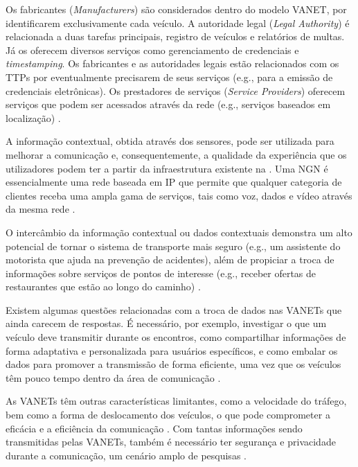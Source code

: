 \documentclass[mestrado, pre-defesa, english, brazil]{packages/icmc}
\begin{document}
Os fabricantes (\textit{Manufacturers}) são considerados dentro do modelo VANET, por identificarem exclusivamente cada veículo. A autoridade legal (\textit{Legal Authority}) é relacionada a duas tarefas principais, registro de veículos e relatórios de multas. Já os  oferecem diversos serviços como gerenciamento de credenciais e \textit{timestamping}. Os fabricantes e as autoridades legais estão relacionados com os TTPs por eventualmente precisarem de seus serviços (e.g., para a emissão de credenciais eletrônicas). Os prestadores de serviços (\textit{Service Providers}) oferecem serviços que podem ser acessados através da rede (e.g., serviços baseados em localização) \cite{Fuentes-2011}.

A informação contextual, obtida através dos sensores, pode ser utilizada para melhorar a comunicação e, consequentemente, a qualidade da experiência que os utilizadores podem ter a partir da infraestrutura existente na . Uma NGN é essencialmente uma rede baseada em IP que permite que qualquer categoria de clientes receba uma ampla gama de serviços, tais como voz, dados e vídeo através da mesma rede \cite{Dharwadkar-2007}.

O intercâmbio da informação contextual ou dados contextuais demonstra um alto potencial de tornar o sistema de transporte mais seguro (e.g., um assistente do motorista que ajuda na prevenção de acidentes), além de propiciar a troca de informações sobre serviços de pontos de interesse (e.g., receber ofertas de restaurantes que estão ao longo do caminho) \cite{Conti-2010,Mapp-2009}.

Existem algumas questões relacionadas com a troca de dados nas VANETs que ainda carecem de respostas. É necessário, por exemplo, investigar o que um veículo deve transmitir durante os encontros, como compartilhar informações de forma adaptativa e personalizada para usuários específicos, e como embalar os dados para promover a transmissão de forma eficiente, uma vez que os veículos têm pouco tempo dentro da área de comunicação \cite{Faezipour-2012}.

As VANETs têm outras características limitantes, como a velocidade do tráfego, bem como a forma de deslocamento dos veículos, o que pode comprometer a eficácia e a eficiência da comunicação \cite{Rubinstein-2009}. Com tantas informações sendo transmitidas pelas VANETs, também é necessário ter segurança e privacidade durante a comunicação, um cenário amplo de pesquisas \cite{Fuentes-2011}.
\end{document}

